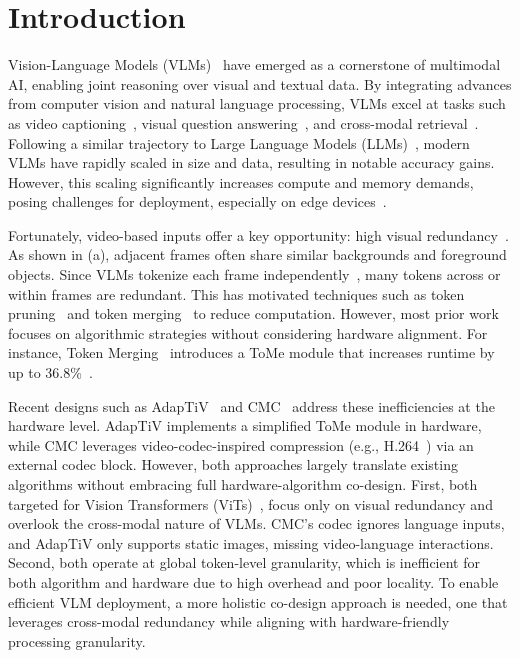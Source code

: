 \section{Introduction}
\label{sec:intro}

Vision-Language Models (VLMs)~\cite{li2024llava,liu2023llava} have emerged as a cornerstone of multimodal AI, enabling joint reasoning over visual and textual data. 
By integrating advances from computer vision and natural language processing, VLMs excel at tasks such as video captioning~\cite{yang2023vid2seq,zhang2024video}, visual question answering~\cite{sinha2024guiding_vlm_sel_for_vqa,das2025vlm_continual_vqa}, and cross-modal retrieval~\cite{li2022blip}. 
Following a similar trajectory to Large Language Models (LLMs)~\cite{brown2020language, devlin2018bert}, modern VLMs have rapidly scaled in size and data, resulting in notable accuracy gains. 
However, this scaling significantly increases compute and memory demands, posing challenges for deployment, especially on edge devices~\cite{sharshar2025vision}.

Fortunately, video-based inputs offer a key opportunity: high visual redundancy~\cite{dynamicllava,voco,prumerge,fastv,wang2025corematching}.  
As shown in (a), adjacent frames often share similar backgrounds and foreground objects.  
Since VLMs tokenize each frame independently~\cite{li2024llava,zhang2024video}, many tokens across or within frames are redundant.  
This has motivated techniques such as token pruning~\cite{sah2024token_pruning_vit,wang2025corematching} and token merging~\cite{bolya2023token} to reduce computation.  
However, most prior work focuses on algorithmic strategies without considering hardware alignment.  
For instance, Token Merging~\cite{bolya2023token} introduces a ToMe module that increases runtime by up to 36.8\%~\cite{yoo2024adaptiv}.

Recent designs such as AdapTiV~\cite{yoo2024adaptiv} and CMC~\cite{song2024cmc} address these inefficiencies at the hardware level.  
AdapTiV implements a simplified ToMe module in hardware, while CMC leverages video-codec-inspired compression (e.g., H.264~\cite{wiegand2003overview}) via an external codec block.
However, both approaches largely translate existing algorithms without embracing full hardware-{algorithm} co-design. 
First, both {targeted for Vision Transformers (ViTs)~\cite{dosovitskiy2020image}, }focus only on visual redundancy and overlook the cross-modal nature of VLMs. 
CMC’s codec ignores language inputs, and AdapTiV only supports static images, missing video-language interactions.
Second, both operate at global token-level granularity, which is inefficient for both algorithm and hardware due to high overhead and poor locality.
To enable efficient VLM deployment, a more holistic co-design approach is needed, one that leverages cross-modal redundancy while aligning with hardware-friendly processing granularity.

